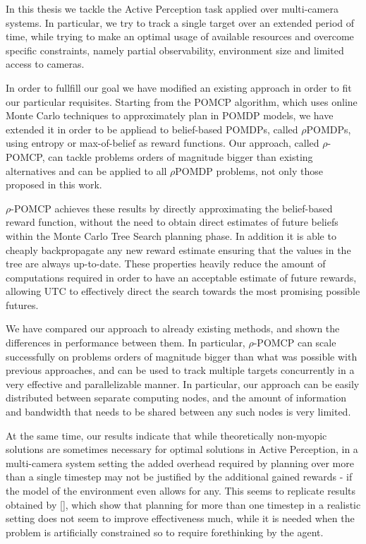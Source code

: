 In this thesis we tackle the Active Perception task applied over multi-camera systems.  In
particular, we try to track a single target  over an extended period of time, while trying to make an
optimal usage of available resources and overcome  specific constraints, namely partial
observability, environment size and limited access to cameras.

In order to fullfill our goal we have modified  an existing approach in order to fit our particular
requisites. Starting from the POMCP algorithm, which uses online Monte Carlo techniques to
approximately plan in POMDP models, we have extended it in order to be appliead to belief-based
POMDPs, called $\rho$POMDPs, using entropy or max-of-belief as reward functions. Our approach,
called $\rho$-POMCP, can tackle problems orders of magnitude bigger than existing alternatives and
can be applied to all $\rho$POMDP problems, not only those proposed in this work.

$\rho$-POMCP achieves these results by directly approximating the belief-based reward function,
without the need to obtain direct estimates of future beliefs within the Monte Carlo Tree Search
planning phase. In addition it is able to cheaply backpropagate any new reward estimate ensuring
that the values in the tree are always up-to-date. These properties heavily reduce the amount of
computations required in order to have an acceptable estimate of future rewards, allowing UTC to
effectively direct the search towards the most promising possible futures.

We have compared our approach to already existing methods, and shown the differences in performance
between them. In particular, $\rho$-POMCP can scale successfully on problems orders of magnitude
bigger than what was possible with previous approaches, and can be used to track multiple targets
concurrently in a very effective and parallelizable manner. In particular, our approach can be
easily distributed between separate computing nodes, and the amount of information and bandwidth
that needs to be shared between any such nodes is very limited.

At the same time, our results indicate that while theoretically non-myopic solutions are sometimes
necessary for optimal solutions in Active Perception, in a multi-camera system setting the added
overhead required by planning over more than a single timestep may not be justified by the
additional gained rewards - if the model of the environment even allows for any. This seems to
replicate results obtained by [],  which show that planning for more than one timestep in a realistic
setting does not seem to improve effectiveness much, while it is needed when the problem is
artificially constrained so to require forethinking by the agent.

